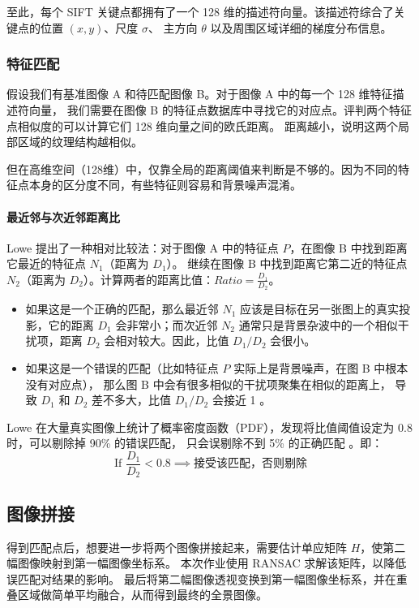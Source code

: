 \documentclass[12pt,hyperref,a4paper,UTF8]{ctexart}
\begin{document}
至此，每个 SIFT 关键点都拥有了一个 128 维的描述符向量。该描述符综合了关键点的位置 $(x,y)$、尺度 $\sigma$、
主方向 $\theta$ 以及周围区域详细的梯度分布信息。

\subsubsection{特征匹配}
假设我们有基准图像 A 和待匹配图像 B。对于图像 A 中的每一个 128 维特征描述符向量，
我们需要在图像 B 的特征点数据库中寻找它的对应点。评判两个特征点相似度的可以计算它们 128 维向量之间的欧氏距离。
距离越小，说明这两个局部区域的纹理结构越相似。

但在高维空间（128维）中，仅靠全局的距离阈值来判断是不够的。因为不同的特征点本身的区分度不同，有些特征则容易和背景噪声混淆。

\paragraph{最近邻与次近邻距离比}
Lowe 提出了一种相对比较法：对于图像 A 中的特征点 $P$，在图像 B 中找到距离它最近的特征点 $N_1$（距离为 $D_1$）。
继续在图像 B 中找到距离它第二近的特征点 $N_2$（距离为 $D_2$）。计算两者的距离比值：$Ratio = \frac{D_1}{D_2}$。

\begin{itemize}
    \item 如果这是一个正确的匹配，那么最近邻 $N_1$ 应该是目标在另一张图上的真实投影，它的距离 $D_1$ 会非常小；而次近邻 $N_2$
          通常只是背景杂波中的一个相似干扰项，距离 $D_2$ 会相对较大。因此，比值 $D_1/D_2$ 会很小。
    \item 如果这是一个错误的匹配（比如特征点 $P$ 实际上是背景噪声，在图 B 中根本没有对应点），
          那么图 B 中会有很多相似的干扰项聚集在相似的距离上，
          导致 $D_1$ 和 $D_2$ 差不多大，比值 $D_1/D_2$ 会接近 1 。
\end{itemize}

Lowe 在大量真实图像上统计了概率密度函数（PDF），发现将比值阈值设定为 0.8 时，可以剔除掉 90\% 的错误匹配，
只会误剔除不到 5\% 的正确匹配 。即：
$$\text{If } \frac{D_1}{D_2} < 0.8 \implies \text{接受该匹配，否则剔除}$$

\subsection{图像拼接}
得到匹配点后，想要进一步将两个图像拼接起来，需要估计单应矩阵 $H$，使第二幅图像映射到第一幅图像坐标系。
本次作业使用 RANSAC\cite{Fischler1981} 求解该矩阵，以降低误匹配对结果的影响。
最后将第二幅图像透视变换到第一幅图像坐标系，并在重叠区域做简单平均融合，从而得到最终的全景图像。
\end{document}
